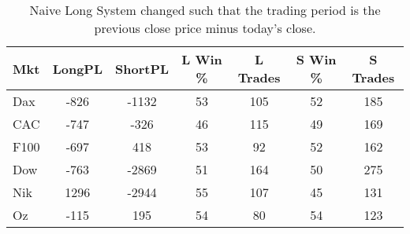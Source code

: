 \begin{table}[ht]
\centering
\caption[Naive Long System - Close to Close]{Naive Long System changed such that the trading period is the previous close price minus today's close.} 
\label{tab:doji_aroon_results}
\begin{tabular}{lcccccc}
  \toprule Mkt & LongPL & ShortPL & L Win \% & L Trades & S Win \% & S Trades \\ 
  \midrule Dax & -826 & -1132 & 53 & 105 & 52 & 185 \\ 
  CAC & -747 & -326 & 46 & 115 & 49 & 169 \\ 
  F100 & -697 & 418 & 53 & 92 & 52 & 162 \\ 
  Dow & -763 & -2869 & 51 & 164 & 50 & 275 \\ 
  Nik & 1296 & -2944 & 55 & 107 & 45 & 131 \\ 
  Oz & -115 & 195 & 54 & 80 & 54 & 123 \\ 
   \bottomrule \end{tabular}
\end{table}
